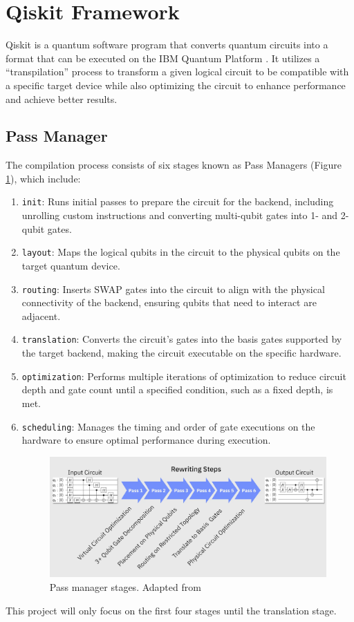 \section{Qiskit Framework}
Qiskit is a quantum software program that converts quantum circuits into a format that can be executed on the IBM Quantum Platform \cite{ibmquantum_computeresources}. It utilizes a ``transpilation'' process to transform a given logical circuit to be compatible with a specific target device while also optimizing the circuit to enhance performance and achieve better results.

\subsection{Pass Manager}
The compilation process consists of six stages known as Pass Managers \cite{ibmquantum_transpiler} (Figure \ref{fig:transpiler}), which include:
\begin{enumerate}[nolistsep]
    \item \lstinline{init}: Runs initial passes to prepare the circuit for the backend, including unrolling custom instructions and converting multi-qubit gates into 1- and 2-qubit gates.
    \item \lstinline{layout}: Maps the logical qubits in the circuit to the physical qubits on the target quantum device.
    \item \lstinline{routing}: Inserts SWAP gates into the circuit to align with the physical connectivity of the backend, ensuring qubits that need to interact are adjacent.
    \item \lstinline{translation}: Converts the circuit's gates into the basis gates supported by the target backend, making the circuit executable on the specific hardware.
    \item \lstinline{optimization}: Performs multiple iterations of optimization to reduce circuit depth and gate count until a specified condition, such as a fixed depth, is met.
    \item \lstinline{scheduling}: Manages the timing and order of gate executions on the hardware to ensure optimal performance during execution.
    \begin{figure}[h]
        \centering
        \includegraphics[width=0.75\linewidth]{image/transpiling_core_steps.png}
        \caption[Pass manager stages]{Pass manager stages. Adapted from \cite{ibmquantum_transpiler}}
        \label{fig:transpiler}
    \end{figure}
\end{enumerate}
This project will only focus on the first four stages until the translation stage.

